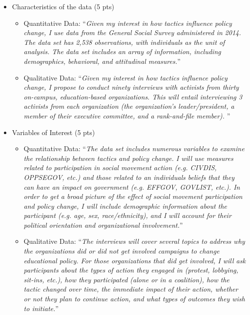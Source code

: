 \documentclass{article}
\begin{document}
\begin{itemize}
\item Characteristics of the data (5 pts)
	\begin{itemize}
	\item Quantitative Data:
	\newline ``{\it{{\color{red}Given my interest in how tactics influence policy change, I use data from the General Social Survey administered in 2014. The data set has 2,538 observations, with individuals as the unit of analysis. The data set includes an array of information, including demographics, behavioral, and attitudinal measures.}}}''
	\item Qualitative Data:
	\newline ``{\it{{\color{red}Given my interest in how tactics influence policy change, I propose to conduct ninety interviews with activists from thirty on-campus, education-based organizations. This will entail interviewing 3 activists from each organization (the organization's leader/president, a member of their executive committee, and a rank-and-file member). }}}''
	\end{itemize}

\item Variables of Interest (5 pts)
	\begin{itemize}
	\item Quantitative Data:
	\newline ``{\it{{\color{red}The data set includes numerous variables to examine the relationship between tactics and policy change. I will use measures related to participation in social movement action (e.g. CIVDIS, OPPSEGOV, etc.) and those related to an individuals beliefs that they can have an impact on government (e.g. EFFGOV, GOVLIST, etc.). In order to get a broad picture of the effect of social movement participation and policy change, I will include demographic information about the participant (e.g. age, sex, race/ethnicity), and I will account for their political orientation and organizational involvement.}}}''
	\item Qualitative Data:
	\newline ``{\it{{\color{red}The interviews will cover several topics to address why the organizations did or did not get involved campaigns to change educational policy. For those organizations that did get involved, I will ask participants about the types of action they engaged in (protest, lobbying, sit-ins, etc.), how they participated (alone or in a coalition), how the tactic changed over time, the immediate impact of their action, whether or not they plan to continue action, and what types of outcomes they wish to initiate.}}}''
	\end{itemize}


\end{itemize}
\end{document}
